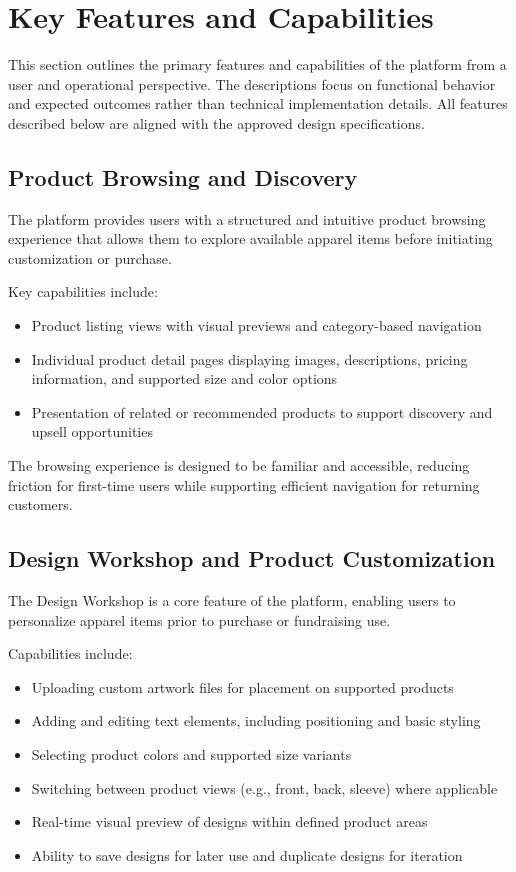 \section{Key Features and Capabilities}

This section outlines the primary features and capabilities of the platform from
a user and operational perspective. The descriptions focus on functional behavior
and expected outcomes rather than technical implementation details. All features
described below are aligned with the approved design specifications.

\subsection{Product Browsing and Discovery}

The platform provides users with a structured and intuitive product browsing
experience that allows them to explore available apparel items before initiating
customization or purchase.

Key capabilities include:
\begin{itemize}[leftmargin=1.5em]
    \item Product listing views with visual previews and category-based navigation
    \item Individual product detail pages displaying images, descriptions, pricing
    information, and supported size and color options
    \item Presentation of related or recommended products to support discovery
    and upsell opportunities
\end{itemize}

The browsing experience is designed to be familiar and accessible, reducing
friction for first-time users while supporting efficient navigation for returning
customers.

\subsection{Design Workshop and Product Customization}

The Design Workshop is a core feature of the platform, enabling users to
personalize apparel items prior to purchase or fundraising use.

Capabilities include:
\begin{itemize}[leftmargin=1.5em]
    \item Uploading custom artwork files for placement on supported products
    \item Adding and editing text elements, including positioning and basic styling
    \item Selecting product colors and supported size variants
    \item Switching between product views (e.g., front, back, sleeve) where applicable
    \item Real-time visual preview of designs within defined product areas
    \item Ability to save designs for later use and duplicate designs for iteration
\end{itemize}

